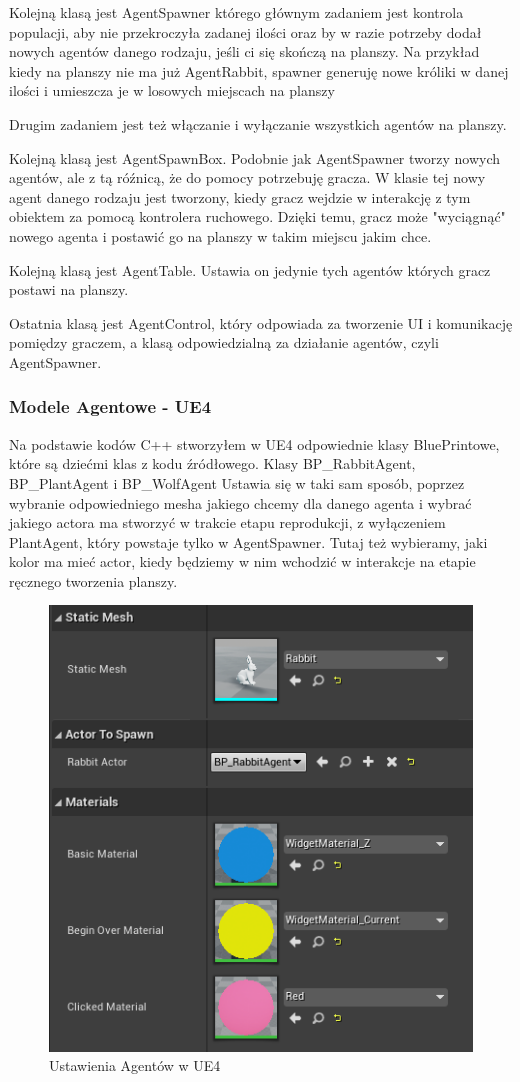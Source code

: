 \documentclass[a4paper,12pt,reqno]{article}
\begin{document}


Kolejną klasą jest AgentSpawner którego głównym zadaniem jest kontrola populacji, aby nie przekroczyła zadanej ilości oraz by w razie potrzeby dodał nowych agentów danego rodzaju, jeśli ci się skończą na planszy. Na przykład kiedy na planszy nie ma już AgentRabbit, spawner generuję nowe króliki w danej ilości i umieszcza je w losowych miejscach na planszy


Drugim zadaniem jest też włączanie i wyłączanie wszystkich agentów na planszy.

Kolejną klasą jest AgentSpawnBox. Podobnie jak AgentSpawner tworzy nowych agentów, ale z tą róźnicą, że do pomocy potrzebuję gracza. W klasie tej nowy agent danego rodzaju jest tworzony, kiedy gracz wejdzie w interakcję z tym obiektem za pomocą kontrolera ruchowego. Dzięki temu, gracz może "wyciągnąć" nowego agenta i postawić go na planszy w takim miejscu jakim chce. 

Kolejną klasą jest AgentTable. Ustawia on jedynie tych agentów których gracz postawi na planszy.

Ostatnia klasą jest AgentControl, który odpowiada za tworzenie UI i komunikację pomiędzy graczem, a klasą odpowiedzialną za działanie agentów, czyli AgentSpawner. 

\subsubsection{Modele Agentowe - UE4}

Na podstawie kodów C++ stworzyłem w UE4 odpowiednie klasy BluePrintowe, które są dziećmi klas z kodu źródłowego. Klasy BP\_RabbitAgent, BP\_PlantAgent i BP\_WolfAgent
Ustawia się w taki sam sposób, poprzez wybranie odpowiedniego mesha jakiego chcemy dla danego agenta i wybrać jakiego actora ma stworzyć w trakcie etapu reprodukcji, z wyłączeniem PlantAgent, który powstaje tylko w AgentSpawner. Tutaj też wybieramy, jaki kolor ma mieć actor, kiedy będziemy w nim wchodzić w interakcje na etapie ręcznego tworzenia planszy.

\begin{figure}[H]%
\centering
\includegraphics[width=0.4\columnwidth]{graphics//agent/BP_AgentActor.png}
\caption{Ustawienia Agentów w UE4 
\label{BPExample}}%
%
\qquad
\end{figure} 
\end{document}
